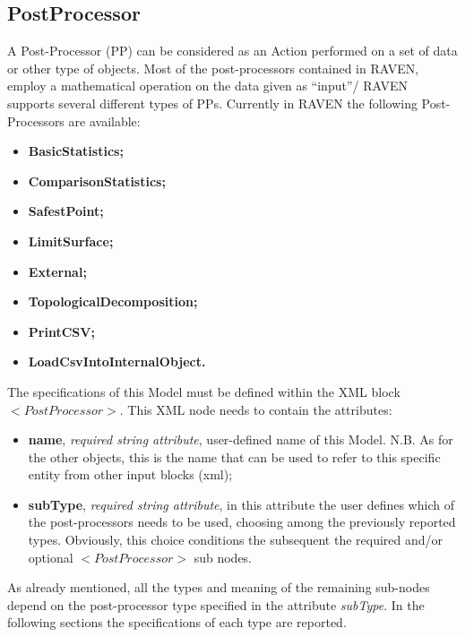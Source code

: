 \subsection{PostProcessor}
\label{sec:models_postProcessor}
A Post-Processor (PP) can be considered as an Action performed on a set of data or other type of objects. Most of the post-processors contained in RAVEN, employ a mathematical operation on the data given as ``input''/
RAVEN supports several different types of PPs. Currently in RAVEN the following Post-Processors are available:
\begin{itemize}
   \item \textbf{BasicStatistics;}
   \item \textbf{ComparisonStatistics;}
   \item \textbf{SafestPoint;}
   \item \textbf{LimitSurface;}
   \item \textbf{External;}
   \item \textbf{TopologicalDecomposition;}
   \item \textbf{PrintCSV;}
   \item \textbf{LoadCsvIntoInternalObject.}
\end{itemize}
The specifications of this Model must be defined within the XML block $<PostProcessor>$. This XML node needs to contain the attributes:
\vspace{-5mm}
\begin{itemize}
\itemsep0em
\item \textbf{name}, \textit{required string attribute}, user-defined name of this Model. N.B. As for the other objects, this is the name that can be used to refer to this specific entity from other input blocks (xml);
\item \textbf{subType}, \textit{required string attribute}, in this attribute the user defines which of the post-processors needs to be used, choosing among the previously reported types. Obviously, this choice conditions the subsequent the required and/or optional $<PostProcessor>$ sub nodes.
\end{itemize}
\vspace{-5mm}
As already mentioned, all the types and meaning of the remaining sub-nodes depend on the post-processor type specified in the attribute \textit{subType}. In the following sections the specifications of each type are reported.
